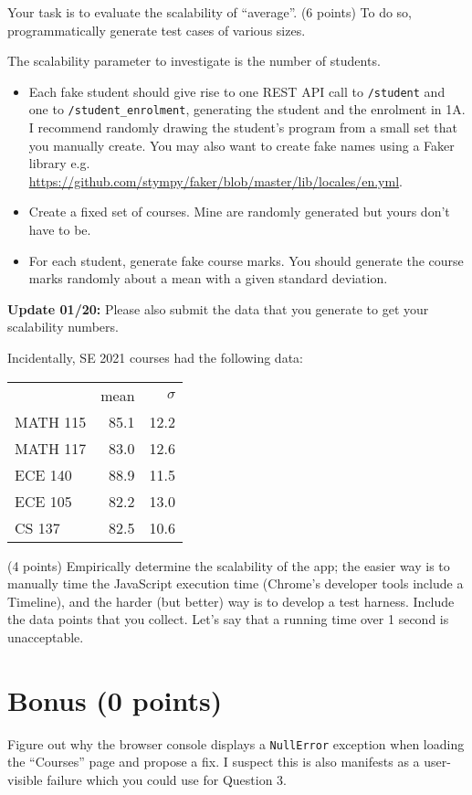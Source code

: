 \documentclass[10pt,hidelinks]{article}
\begin{document}
Your task is to evaluate the scalability of ``average''. (6 points) To do
so, programmatically generate test cases of various sizes. 

The scalability parameter to investigate is the number of students.
\begin{itemize}
\item Each fake student should give rise to one REST API call to
{\tt /student} and one to {\tt /student\_enrolment}, generating the
student and the enrolment in 1A. I recommend randomly drawing the
student's program from a small set that you manually create. 
You may also want to create fake names using a Faker library e.g.
\url{https://github.com/stympy/faker/blob/master/lib/locales/en.yml}.
\item Create a fixed set of courses. Mine are randomly generated but
yours don't have to be. 
\item For each student, generate fake course marks. 
You should generate the course marks randomly about a mean with a given
standard deviation.
\end{itemize}

{\bf Update 01/20:} Please also submit the data that you generate to get your scalability numbers.

Incidentally, SE 2021 courses had the following data: 

\begin{center}
\begin{tabular}{lrr}
& mean & $\sigma$\\
MATH 115 & 85.1 & 12.2 \\
MATH 117 & 83.0 & 12.6 \\
ECE 140 & 88.9 & 11.5 \\
ECE 105 & 82.2 & 13.0 \\
CS 137 & 82.5 & 10.6
\end{tabular}
\end{center}

(4 points) Empirically determine the scalability of the app; the easier way is to
manually time the JavaScript execution time (Chrome's developer tools
include a Timeline), and the harder (but better) way is to develop a
test harness.  Include the data points that you collect. Let's say
that a running time over 1 second is unacceptable.

\section*{Bonus (0 points)}
Figure out why the browser console displays a {\tt NullError} exception
when loading the ``Courses'' page and propose a fix.
I suspect this is also manifests as a user-visible failure which
you could use for Question 3.
\end{document}
